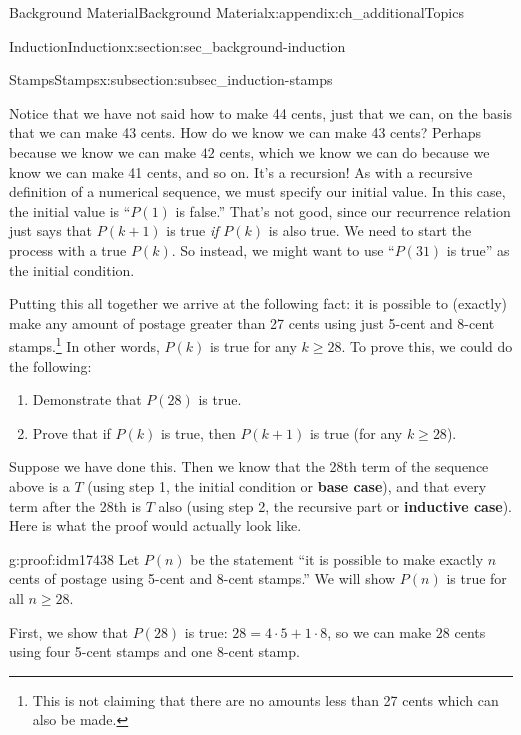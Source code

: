 \documentclass[oneside,10pt,]{book}
\newcommand{\terminology}[1]{\textbf{#1}}
\numberwithin{equation}{chapter}
\begin{document}
\begin{appendixptx}{Background Material}{}{Background Material}{}{}{x:appendix:ch_additionalTopics}
\begin{sectionptx}{Induction}{}{Induction}{}{}{x:section:sec_background-induction}
\begin{subsectionptx}{Stamps}{}{Stamps}{}{}{x:subsection:subsec_induction-stamps}
\par
Notice that we have not said how to make 44 cents, just that we can, on the basis that we can make 43 cents. How do we know we can make 43 cents? Perhaps because we know we can make \(42\)\label{g:notation:idm17409} cents, which we know we can do because we know we can make 41 cents, and so on. It's a recursion! As with a recursive definition of a numerical sequence, we must specify our initial value. In this case, the initial value is ``\(P(1)\) is false.'' That's not good, since our recurrence relation just says that \(P(k+1)\) is true \emph{if} \(P(k)\) is also true. We need to start the process with a true \(P(k)\). So instead, we might want to use ``\(P(31)\) is true'' as the initial condition.%
\par
Putting this all together we arrive at the following fact: it is possible to (exactly) make any amount of postage greater than 27 cents using just 5-cent and 8-cent stamps.\footnote{This is not claiming that there are no amounts less than 27 cents which can also be made.\label{g:fn:idm17421}} In other words, \(P(k)\) is true for any \(k \ge 28\). To prove this, we could do the following:%
\begin{enumerate}
\item{}Demonstrate that \(P(28)\) is true.%
\item{}Prove that if \(P(k)\) is true, then \(P(k+1)\) is true (for any \(k \ge 28\)).%
\end{enumerate}
%
\par
Suppose we have done this. Then we know that the 28th term of the sequence above is a \(T\) (using step 1, the initial condition or \terminology{base case}), and that every term after the 28th is \(T\) also (using step 2, the recursive part or \terminology{inductive case}). Here is what the proof would actually look like.%
\begin{proofptx}{}{g:proof:idm17438}
Let \(P(n)\) be the statement ``it is possible to make exactly \(n\) cents of postage using 5-cent and 8-cent stamps.'' We will show \(P(n)\) is true for all \(n \ge 28\).%
\par
First, we show that \(P(28)\) is true: \(28 =  4 \cdot 5+ 1\cdot 8\), so we can make \(28\) cents using four 5-cent stamps and one 8-cent stamp.%
\par

\end{proofptx}
\end{subsectionptx}
\end{sectionptx}
\end{appendixptx}
\end{document}
